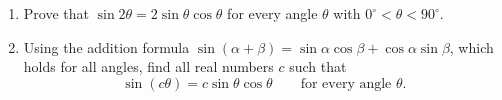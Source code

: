 \begin{enumerate}
\item[(a)] Prove that $\sin2\theta=2\sin\theta\cos\theta$ for every angle $\theta$ with $0^\circ<\theta<90^\circ$.
\item[(b)] Using the addition formula $\sin(\alpha+\beta)=\sin\alpha\cos\beta+\cos\alpha\sin\beta$, which holds for all angles, find all real numbers $c$ such that
\[\sin(c\theta)=c\sin\theta\cos\theta\qquad\text{for every angle }\theta.\]
\end{enumerate}
